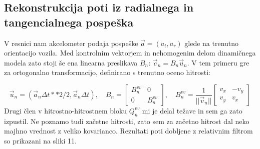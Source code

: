 \documentclass[slovene,11pt,a4paper]{article}
\begin{document}
\subsection{Rekonstrukcija poti iz radialnega in tangencialnega pospeška}

V resnici nam akcelometer podaja pospeške $\vec{a} = (a_t, a_r)$ glede na trenutno orientacijo vozila. Med kontrolnim vektorjem in nehomogenim delom dinamičnega modela zato stoji še ena linearna preslikava $B_n: \, \vec{c}_n = B_n \vec{u}_n$. V tem primeru gre za ortogonalno transformacijo, definirano s trenutno oceno hitrosti:

\begin{equation}
\vec{u}_n  = (\vec{a}_n \Delta t**2 /2, \vec{a}_n \Delta t), \quad
B_n = 
\begin{bmatrix}
 B_n^{vv} & 0 \\
 0        & B_n^{vv}
\end{bmatrix}
,\quad
B_n^{vv} = \frac{1}{||\vec{v}_n||}
\begin{bmatrix}
 v_x & -v_y \\
 v_y & v_x
\end{bmatrix}
\end{equation}
Drugi člen v hitrostno-hitrostnem bloku $Q_n^{vv}$ mi je delal težave in sem ga zato izpustil. Ne poznamo tudi začetne hitrosti, zato sem za začetno hitrost dal neko majhno vrednost z veliko kovarianco. Rezultati poti dobljene z relativnim filtrom so prikazani na sliki 11.
\end{document}
